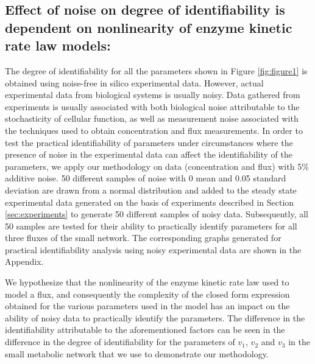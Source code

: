 \documentclass[10pt]{article}
\begin{document}
\subsection{Effect of noise on degree of identifiability is dependent on nonlinearity of enzyme kinetic rate law models:}\label{sec:noise}
The degree of identifiability for all the parameters shown in Figure \ref{fig:figure1} is obtained using noise-free in silico experimental data. However, actual experimental data from biological systems is usually noisy. Data gathered from experiments is usually associated with both biological noise attributable to the stochasticity of cellular function, as well as measurement noise associated with the techniques used to obtain concentration and flux measurements. In order to test the practical identifiability of parameters under circumstances where the presence of noise in the experimental data can affect the identifiability of the parameters, we apply our methodology on data (concentration and flux) with 5\% additive noise. 50 different samples of noise with 0 mean and 0.05 standard deviation are drawn from a normal distribution and added to the steady state experimental data generated on the basis of experiments described in Section \ref{sec:experiments} to generate 50 different samples of noisy data. Subsequently, all 50 samples are tested for their ability to practically identify parameters for all three fluxes of the small network. The corresponding graphs generated for practical identifiability analysis using noisy experimental data are shown in the Appendix. 

We hypothesize that the nonlinearity of the enzyme kinetic rate law used to model a flux, and consequently the complexity of the closed form expression obtained for the various parameters used in the model has an impact on the ability of noisy data to practically identify the parameters. The difference in the identifiability attributable to the aforementioned factors can be seen in the difference in the degree of identifiability for the parameters of $v_1$, $v_2$ and $v_3$ in the small metabolic network that we use to demonstrate our methodology. 
\end{document}
